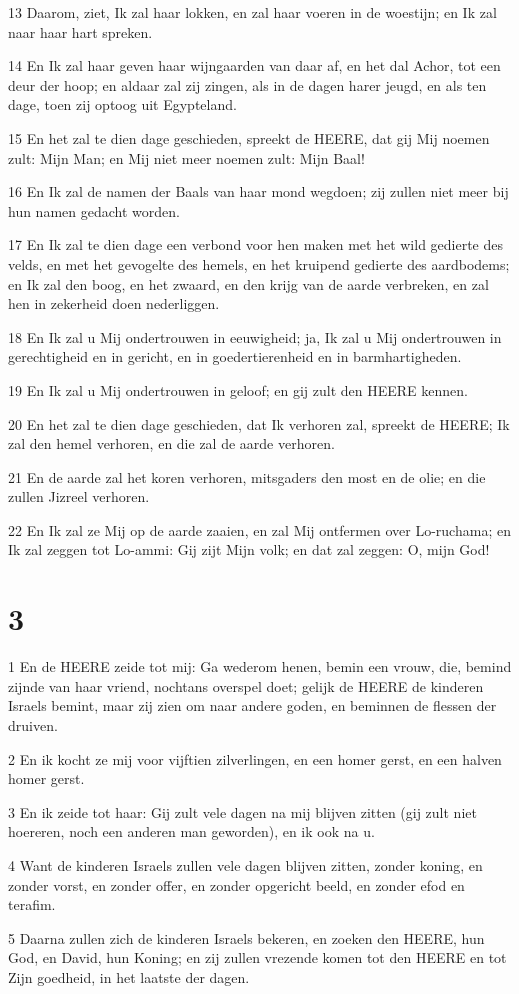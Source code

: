 \par 13 Daarom, ziet, Ik zal haar lokken, en zal haar voeren in de woestijn; en Ik zal naar haar hart spreken.
\par 14 En Ik zal haar geven haar wijngaarden van daar af, en het dal Achor, tot een deur der hoop; en aldaar zal zij zingen, als in de dagen harer jeugd, en als ten dage, toen zij optoog uit Egypteland.
\par 15 En het zal te dien dage geschieden, spreekt de HEERE, dat gij Mij noemen zult: Mijn Man; en Mij niet meer noemen zult: Mijn Baal!
\par 16 En Ik zal de namen der Baals van haar mond wegdoen; zij zullen niet meer bij hun namen gedacht worden.
\par 17 En Ik zal te dien dage een verbond voor hen maken met het wild gedierte des velds, en met het gevogelte des hemels, en het kruipend gedierte des aardbodems; en Ik zal den boog, en het zwaard, en den krijg van de aarde verbreken, en zal hen in zekerheid doen nederliggen.
\par 18 En Ik zal u Mij ondertrouwen in eeuwigheid; ja, Ik zal u Mij ondertrouwen in gerechtigheid en in gericht, en in goedertierenheid en in barmhartigheden.
\par 19 En Ik zal u Mij ondertrouwen in geloof; en gij zult den HEERE kennen.
\par 20 En het zal te dien dage geschieden, dat Ik verhoren zal, spreekt de HEERE; Ik zal den hemel verhoren, en die zal de aarde verhoren.
\par 21 En de aarde zal het koren verhoren, mitsgaders den most en de olie; en die zullen Jizreel verhoren.
\par 22 En Ik zal ze Mij op de aarde zaaien, en zal Mij ontfermen over Lo-ruchama; en Ik zal zeggen tot Lo-ammi: Gij zijt Mijn volk; en dat zal zeggen: O, mijn God!

\chapter{3}

\par 1 En de HEERE zeide tot mij: Ga wederom henen, bemin een vrouw, die, bemind zijnde van haar vriend, nochtans overspel doet; gelijk de HEERE de kinderen Israels bemint, maar zij zien om naar andere goden, en beminnen de flessen der druiven.
\par 2 En ik kocht ze mij voor vijftien zilverlingen, en een homer gerst, en een halven homer gerst.
\par 3 En ik zeide tot haar: Gij zult vele dagen na mij blijven zitten (gij zult niet hoereren, noch een anderen man geworden), en ik ook na u.
\par 4 Want de kinderen Israels zullen vele dagen blijven zitten, zonder koning, en zonder vorst, en zonder offer, en zonder opgericht beeld, en zonder efod en terafim.
\par 5 Daarna zullen zich de kinderen Israels bekeren, en zoeken den HEERE, hun God, en David, hun Koning; en zij zullen vrezende komen tot den HEERE en tot Zijn goedheid, in het laatste der dagen.

